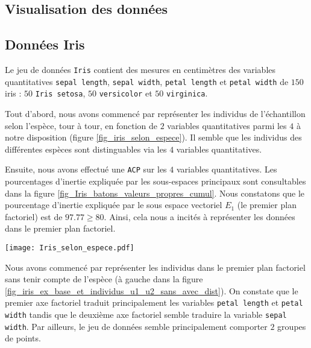 \documentclass{article}
\begin{document}
\begin{multicols}{2} %



\section{Visualisation des données}
\label{sec_visualisation_donnes}

\subsection{Données Iris}
\label{subsec_visualisation_donnes_iris}
Le jeu de données \texttt{Iris} contient des mesures en centimètres des variables quantitatives \texttt{sepal length}, \texttt{sepal width}, \texttt{petal length} et \texttt{petal width} de $150$ iris : $50$ \texttt{Iris setosa}, $50$ \texttt{versicolor} et $50$ \texttt{virginica}.

Tout d'abord, nous avons commencé par représenter les individus de l'échantillon selon l'espèce, tour à tour, en fonction de $2$ variables quantitatives parmi les $4$ à notre disposition (figure \ref{fig_iris_selon_espece}). Il semble que les individus des différentes espèces sont distinguables via les $4$ variables quantitatives.

Ensuite, nous avons effectué une \texttt{ACP} sur les $4$ variables quantitatives. Les pourcentages d'inertie expliquée par les sous-espaces principaux sont consultables dans la figure \ref{fig_Iris_batons_valeurs_propres_cumul}. Nous constatons que le pourcentage d'inertie expliquée par le sous espace vectoriel $E_1$ (le premier plan factoriel) est de $97.77 \geq 80$. Ainsi, cela nous a incités à représenter les données dans le premier plan factoriel. 

\begingroup
   \centering
   \texttt{[image: Iris\_selon\_espece.pdf]}
    \label{fig_iris_selon_espece}
\endgroup

Nous avons commencé par représenter les individus dans le premier plan factoriel sans tenir compte de l'espèce (à gauche dans la figure \ref{fig_iris_ex_base_et_individus_u1_u2_sans_avec_dist}). On constate que le premier axe factoriel traduit principalement les variables \texttt{petal length} et \texttt{petal width} tandis que le deuxième axe factoriel semble traduire la variable \texttt{sepal width}. Par ailleurs, le jeu de données semble principalement comporter $2$ groupes de points.


\end{multicols}
\end{document}
